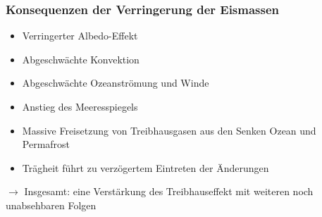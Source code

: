 \begin{frame}
	\frametitle{Konsequenzen der Verringerung der Eismassen}
	\begin{itemize}
		\item Verringerter Albedo-Effekt
		\item Abgeschwächte Konvektion
		\item Abgeschwächte Ozeanströmung und Winde
		\item Anstieg des Meeresspiegels
		\item Massive Freisetzung von Treibhausgasen aus den Senken Ozean und Permafrost
		\item Trägheit führt zu verzögertem Eintreten der Änderungen
	\end{itemize}

	$\rightarrow$ Insgesamt: eine Verstärkung des Treibhauseffekt mit weiteren noch unabsehbaren Folgen

\end{frame}
